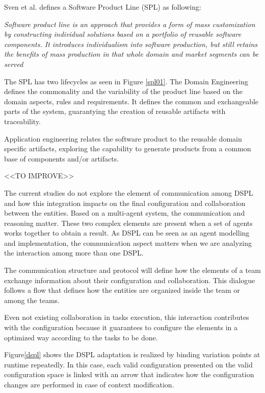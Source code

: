 Sven et al. \cite{SPL10} defines a Software Product Line (SPL) as following:

\textit{Software product line is an approach that provides a form of mass customization by constructing individual solutions based on a portfolio of reusable software components. It introduces individualism into software production, but still retains the benefits of mass production in that whole domain and market segments can be served}

%

The SPL has two lifecycles as seen in Figure \ref{spl01}. The Domain Engineering defines the commonality and the variability of the product line based on the domain aspects, rules and requirements. It defines the common and exchangeable parts of the system, guarantying the creation of reusable artifacts with traceability.

Application engineering relates the software product to the reusable domain specific artifacts, exploring the capability to generate products from a common base of components and/or artifacts.


<<TO IMPROVE>>

The current studies do not explore the element of communication among DSPL and how this integration impacts on the final configuration and collaboration between the entities. Based on a multi-agent system, the communication and reasoning matter. These two complex elements are present when a set of agents works together to obtain a result.
As DSPL can be seen as an agent modelling and implementation, the communication aspect matters when we are analyzing the interaction among more than one DSPL.

The communication structure and protocol will define how the elements of a team exchange information about their configuration and collaboration. This dialogue follows a flow that defines how the entities are organized inside the team or among the teams.

Even not existing collaboration in tasks execution, this interaction contributes with the configuration because it guarantees to configure the elements in a optimized way according to the tasks to be done.

Figure\ref{dspl} shows the DSPL adaptation is realized by binding variation points at runtime repeatedly. In this case, each valid configuration presented on the valid configuration space is linked with an arrow that indicates how the configuration changes are performed in case of context modification.


